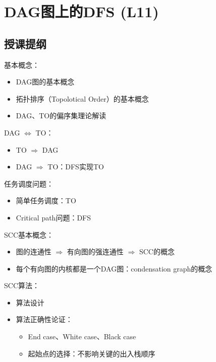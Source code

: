 \chapter{DAG图上的DFS (L11)}

\section*{授课提纲}

\nid 基本概念：
\begin{itemize}
    \item DAG图的基本概念
    \item 拓扑排序（Topolotical Order）的基本概念
    \item DAG、TO的偏序集理论解读
\end{itemize}

\nid DAG $\Leftrightarrow$ TO：
\begin{itemize}
    \item TO $\Rightarrow$ DAG
    \item DAG $\Rightarrow$ TO：DFS实现TO
\end{itemize}

\nid 任务调度问题：
\begin{itemize}
    \item 简单任务调度：TO
    \item Critical path问题：DFS
\end{itemize}

\nid SCC基本概念：
\begin{itemize}
    \item 图的连通性 $\Rightarrow$ 有向图的强连通性 $\Rightarrow$ SCC的概念
    \item 每个有向图的内核都是一个DAG图：condensation graph的概念
\end{itemize}

\nid SCC算法：
\begin{itemize}
    \item 算法设计
    \item 算法正确性论证：
    \begin{itemize}
        \item End case、White case、Black case
        \item 起始点的选择：不影响关键的出入栈顺序
    \end{itemize}
\end{itemize}

